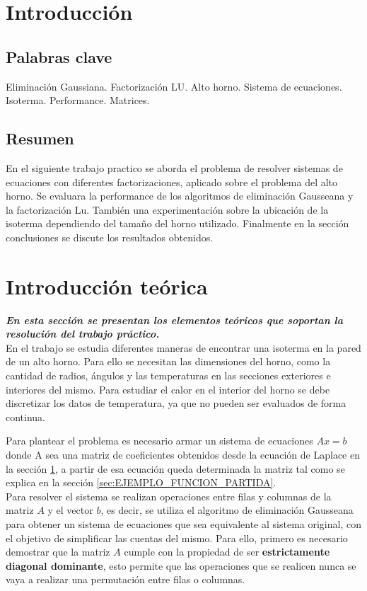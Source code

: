 \section{Introducción}
\label{sec:EJEMPLO}
\subsection{Palabras clave}

Eliminación Gaussiana. Factorización LU. Alto horno. Sistema de ecuaciones. Isoterma. Performance. Matrices.

\subsection{Resumen}


En el siguiente trabajo practico se aborda el problema de resolver sistemas de ecuaciones con diferentes factorizaciones, aplicado sobre el problema del alto horno. Se evaluara la performance de los algoritmos de eliminación Gausseana y la factorización Lu. También una experimentación sobre la ubicación de la isoterma dependiendo del tamaño del horno utilizado. Finalmente en la sección conclusiones se discute los resultados obtenidos. 

\section{Introducción teórica}


\textbf{\textit{En esta sección se presentan los elementos teóricos que soportan la resolución del trabajo práctico.}} 
\\

En el trabajo se estudia diferentes maneras de encontrar una isoterma en la pared de un alto horno. Para ello se necesitan las dimensiones del horno, como la cantidad de radios, ángulos y las temperaturas en las secciones exteriores e interiores del mismo. Para estudiar el calor en el interior del horno se debe discretizar los datos de temperatura, ya que no pueden ser evaluados de forma continua. 

Para plantear el problema es necesario armar un sistema de ecuaciones $Ax =b$ donde A sea una matriz de coeficientes obtenidos desde la ecuación de Laplace en la sección \ref{sec:EJEMPLO}, a partir de esa ecuación queda determinada la matriz tal como se explica en la sección \ref{sec:EJEMPLO_FUNCION_PARTIDA}. \\
Para resolver el sistema se realizan operaciones entre filas y columnas de la matriz $A$ y el vector $b$, es decir, se utiliza el algoritmo de eliminación 
Gausseana para obtener un sistema de ecuaciones que sea equivalente al sistema original, con el objetivo de simplificar las cuentas del mismo. Para ello, primero es necesario demostrar que la matriz $A$ cumple con la propiedad de ser \textbf{estrictamente diagonal dominante}, esto permite que las operaciones que se realicen nunca se vaya a realizar una permutación entre filas o columnas. 

